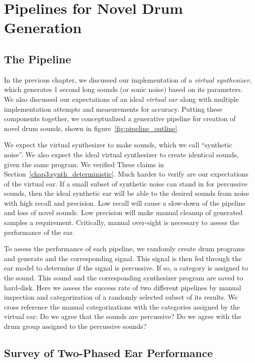 \documentclass[\main/thesis.tex]{subfiles}
\begin{document}
\chapter{Pipelines for Novel Drum Generation}

\label{gens}
\label{surveys}
\section{The Pipeline}
 In the previous chapter, we discussed our implementation of a \emph{virtual synthesizer}, which generates 1 second long sounds (or sonic noise) based on its parameters. We also discussed our expectations of an ideal \emph{virtual ear} along with multiple implementation attempts and measurements for accuracy. Putting these components together, we conceptualized a generative pipeline for creation of novel drum sounds, shown in figure~\ref{fig:pipeline_outline}.
 
 We expect the virtual synthesizer to make sounds, which we call \enquote{synthetic noise}. We also expect the ideal virtual synthesizer to create identical sounds, given the same program. We verified These claims in Section~\ref{chap3:synth_deterministic}. Much harder to verify are our expectations of the virtual ear. If a small subset of synthetic noise can stand in for percussive sounds, then the ideal synthetic ear will be able to the desired sounds from noise with high recall and precision. Low recall will cause a slow-down of the pipeline and loss of novel sounds. Low precision will make manual cleanup of generated samples a requirement. Critically, manual over-sight is necessary to assess the performance of the ear. 

To assess the performance of each pipeline, we randomly create drum programs and generate and the corresponding signal. This signal is then fed through the ear model to determine if the signal is percussive. If so, a category is assigned to the sound. This sound and the corresponding synthesizer program are saved to hard-disk. Here we assess the success rate of two different pipelines by manual inspection and categorization of a randomly selected subset of its results. We cross reference the manual categorizations with the categories assigned by the virtual ear: Do we agree that the sounds are percussive? Do we agree with the drum group assigned to the percussive sounds?
 
 \section{Survey of Two-Phased Ear Performance}
   
\end{document}
